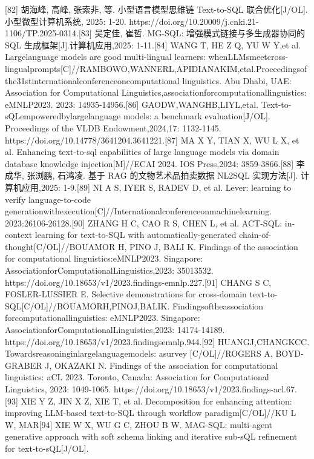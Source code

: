 \documentclass[12pt,a4paper,openright,UTF8]{ctexbook}
\begin{document}
[82] 胡海峰, 高峰, 张索非, 等. 小型语言模型思维链 Text-to-SQL 联合优化[J/OL].小型微型计算机系统, 2025: 1-20. https://doi.org/10.20009/j.cnki.21-1106/TP.2025-0314.[83] 吴定佳, 崔哲. MG-SQL: 增强模式链接与多生成器协同的 SQL 生成框架[J].计算机应用,2025: 1-11.[84] WANG T, HE Z Q, YU W Y,et al. Largelanguage models are good multi-lingual learners: whenLLMsmeetcross-lingualprompts[C]//RAMBOWO,WANNERL,APIDIANAKIM,etal.Proceedingsofthe31stinternationalconferenceoncomputational linguistics. Abu Dhabi, UAE: Association for Computational Linguistics,associationforcomputationallinguistics: eMNLP2023. 2023: 14935-14956.[86] GAODW,WANGHB,LIYL,etal. Text-to-sQLempoweredbylargelanguage models: a benchmark evaluation[J/OL]. Proceedings of the VLDB Endowment,2024,17: 1132-1145. https://doi.org/10.14778/3641204.3641221.[87] MA X Y, TIAN X, WU L X, et al. Enhancing text-to-sql capabilities of large language models via domain database knowledge injection[M]//ECAI 2024. IOS Press,2024: 3859-3866.[88] 李成华, 张浏鹏, 石鸿凌. 基于 RAG 的文物艺术品拍卖数据 NL2SQL 实现方法[J]. 计算机应用,2025: 1-9.[89] NI A S, IYER S, RADEV D, et al. Lever: learning to verify language-to-code generationwithexecution[C]//Internationalconferenceonmachinelearning. 2023:26106-26128.[90] ZHANG H C, CAO R S, CHEN L, et al. ACT-SQL: in-context learning for text-to-SQL with automatically-generated chain-of-thought[C/OL]//BOUAMOR H, PINO J, BALI K. Findings of the association for computational linguistics:eMNLP2023. Singapore: AssociationforComputationalLinguistics,2023: 35013532. https://doi.org/10.18653/v1/2023.findings-emnlp.227.[91] CHANG S C, FOSLER-LUSSIER E. Selective demonstrations for cross-domain text-to-SQL[C/OL]//BOUAMORH,PINOJ,BALIK. Findingsoftheassociation forcomputationallinguistics: eMNLP2023. Singapore: AssociationforComputationalLinguistics,2023: 14174-14189. https://doi.org/10.18653/v1/2023.findingsemnlp.944.[92] HUANGJ,CHANGKCC. Towardsreasoninginlargelanguagemodels: asurvey [C/OL]//ROGERS A, BOYD-GRABER J, OKAZAKI N. Findings of the association for computational linguistics: aCL 2023. Toronto, Canada: Association for Computational Linguistics, 2023: 1049-1065. https://doi.org/10.18653/v1/2023.findings-acl.67.[93] XIE Y Z, JIN X Z, XIE T, et al. Decomposition for enhancing attention: improving LLM-based text-to-SQL through workflow paradigm[C/OL]//KU L W, MAR[94] XIE W X, WU G C, ZHOU B W. MAG-SQL: multi-agent generative approach with soft schema linking and iterative sub-sQL refinement for text-to-sQL[J/OL].
\end{document}
